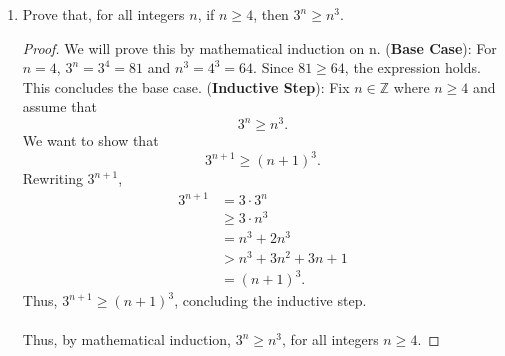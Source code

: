 \documentclass{article}
\begin{document}
\begin{enumerate}
    	\item Prove that, for all integers $n$, if $n \ge 4$, then $3^n \ge n^3$.
                \begin{proof}
                    We will prove this by mathematical induction on n.
                    \ppar (\textbf{Base Case}): For $n = 4$, $3^n = 3^4 = 81$ and $n^3 = 4^3 = 64$. Since $81 \ge 64$, the expression holds. This concludes the base case.
                    \ppar (\textbf{Inductive Step}): Fix $n\in\mathbb{Z}$ where $n \ge 4$ and assume that
                        \[
    			             3^n \ge n^3.
    		          \]
                    \ppar We want to show that
                        \[
    			             3^{n + 1} \ge (n + 1)^3.
    		          \]
                    \ppar Rewriting $3^{n + 1}$, 
                        \begin{align*}
                            3^{n + 1} &= 3 \cdot 3^n \\ 
                            &\ge 3 \cdot n^3 \\
                            &= n^3 + 2n^3 \\
                            &> n^3 + 3n^2 + 3n + 1 \\
                            &= (n + 1)^3.
                        \end{align*}
                    \ppar Thus, $3^{n + 1} \ge (n + 1)^3$, concluding the inductive step.
                    \\\\ Thus, by mathematical induction, $3^n \ge n^3$, for all integers $n \ge 4$.
                \end{proof}


\end{enumerate}
\end{document}
